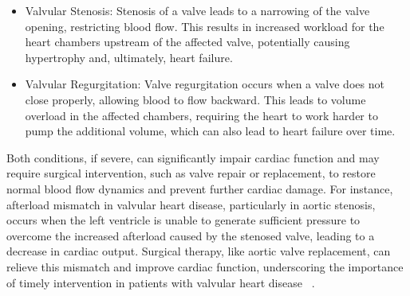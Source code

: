 \begin{itemize}
    \item Valvular Stenosis: Stenosis of a valve leads to a narrowing of the valve opening, restricting blood flow. This results in increased workload for the heart chambers upstream of the affected valve, potentially causing hypertrophy and, ultimately, heart failure.
    \item Valvular Regurgitation: Valve regurgitation occurs when a valve does not close properly, allowing blood to flow backward. This leads to volume overload in the affected chambers, requiring the heart to work harder to pump the additional volume, which can also lead to heart failure over time.
\end{itemize}
Both conditions, if severe, can significantly impair cardiac function and may require surgical intervention, such as valve repair or replacement, to restore normal blood flow dynamics and prevent further cardiac damage. For instance, afterload mismatch in valvular heart disease, particularly in aortic stenosis, occurs when the left ventricle is unable to generate sufficient pressure to overcome the increased afterload caused by the stenosed valve, leading to a decrease in cardiac output. Surgical therapy, like aortic valve replacement, can relieve this mismatch and improve cardiac function, underscoring the importance of timely intervention in patients with valvular heart disease ~.


